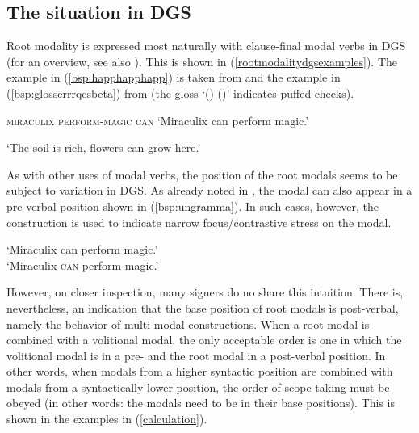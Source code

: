 \subsection{The situation in DGS}
\noindent Root modality is expressed most naturally with clause-final modal verbs in DGS (for an overview, see also \citealt{pfauquer2007syntaxofnegationandmodals}). This is shown in (\ref{rootmodalitydgsexamples}). The example in (\ref{bsp:happhapphapp}) is taken from \citet[359]{happ2014vork} and the example in (\ref{bsp:glosserrrqcsbeta}) from \citet[23]{bross2017scope} (the gloss `() ()' indicates puffed cheeks).

\begin{exe}
\ex\label{rootmodalitydgsexamples}\begin{xlist}
\ex\label{bsp:happhapphapp}
{}   
{\textsc{miraculix perform-magic can}}    
\glt `Miraculix can perform magic.' 

\ex\label{bsp:glosserrrqcsbeta}
  
\glt `The soil is rich, flowers can grow here.' 
\end{xlist}
\end{exe}

\noindent As with other uses of modal verbs, the position of the root modals seems to be subject to variation in DGS. As already noted in \citet[23]{bross2017scope}, the modal can also appear in a pre-verbal position shown in (\ref{bsp:ungramma}). In such cases, however, the construction is used to indicate narrow focus/contrastive stress on the modal.

\begin{exe}
   \label{bsp:ungramma} 
\glt *\phantom{\cmark} `Miraculix can perform magic.' \\
\cmark\phantom{*} `Miraculix \textsc{can} perform magic.'
\end{exe}

\noindent However, on closer inspection, many signers do no share this intuition. There is, nevertheless, an indication that the base position of root modals is post-verbal, namely the behavior of multi-modal constructions. When a root modal is combined with a volitional modal, the only acceptable order is one in which the volitional modal is in a pre- and the root modal in a post-verbal position. In other words, when modals from a higher syntactic position are combined with modals from a syntactically lower position, the order of scope-taking must be obeyed (in other words: the modals need to be in their base positions). This is shown in the examples in (\ref{calculation}).

